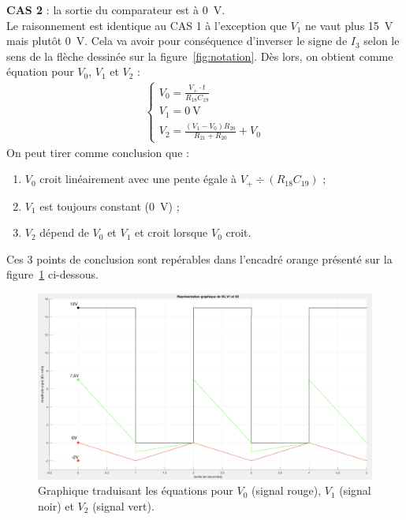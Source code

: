 \documentclass[10pt, oneside, a4paper]{article}
\begin{document}
\noindent\textbf{CAS 2} : la sortie du comparateur est à \SI{0}{\volt}. \\
Le raisonnement est identique au CAS 1 à l'exception que $V_1$ ne vaut plus \SI{15}{\volt} mais plutôt \SI{0}{\volt}.
Cela va avoir pour conséquence d'inverser le signe de $I_3$ selon le sens de la flèche dessinée sur la figure~\ref{fig:notation}.
Dès lors, on obtient comme équation pour $V_0$, $V_1$ et $V_2$ :
\begin{gather}
    \begin{cases}
        V_0 = \frac{V_+ \cdot t}{R_{18}C_{19}} \\[2mm]
        V_1 = \SI{0}{\volt} \\[2mm]
        V_2 = \frac{(V_1 - V_0) R_{20}}{R_{21}+R_{20}} + V_0
    \end{cases}
\end{gather}
On peut tirer comme conclusion que :
\begin{enumerate}
    \item $V_0$ croit linéairement avec une pente égale à $V_+ \div \left(R_{18}
        C_{19}\right)$ ;
    \item $V_1$ est toujours constant (\SI{0}{\volt}) ;
    \item $V_2$ dépend de $V_0$ et $V_1$ et croit lorsque $V_0$ croit.
\end{enumerate}
Ces 3 points de conclusion sont repérables dans l'encadré orange présenté sur la figure~\ref{fig:Graphe_Sigma_Delta} ci-dessous.
\begin{figure}[!ht]
    \centering
    \includegraphics[width=\textwidth]{image/Sigma_Delta_Graphe.png}
    \caption{Graphique traduisant les équations pour $V_0$ (signal rouge), $V_1$ (signal noir) et $V_2$ (signal vert).}
    \label{fig:Graphe_Sigma_Delta}
\end{figure}
\newpage
\end{document}
